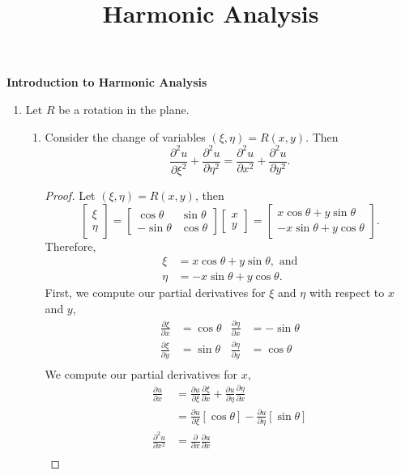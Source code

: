 \documentclass[12pt]{article}
\title{Harmonic Analysis}
\begin{document}
\noindent \textbf{Introduction to Harmonic Analysis}
\begin{enumerate}
\item Let $R$ be a rotation in the plane. 
\begin{enumerate}
\item Consider the change of variables $(\xi, \eta)=R(x,y)$. Then
$$\frac{\partial^2u}{\partial\xi^2} + \frac{\partial^2u}{\partial\eta^2} = \frac{\partial^2u}{\partial x^2} + \frac{\partial^2u}{\partial y^2}.$$
\begin{proof}
Let $(\xi, \eta) = R(x,y)$, then
$$\begin{bmatrix} \xi \\ \eta \end{bmatrix}= \begin{bmatrix}\cos \theta & \sin \theta \\ -\sin \theta & \cos \theta \end{bmatrix}\begin{bmatrix} x \\ y \end{bmatrix} = \begin{bmatrix} x\cos \theta + y \sin \theta \\ -x\sin \theta + y \cos \theta \end{bmatrix}.$$
Therefore, 
\begin{align*}
\xi &= x \cos\theta + y \sin\theta, \text{ and}\\
\eta &= -x\sin \theta + y\cos \theta.
\end{align*}
First, we compute our partial derivatives for $\xi$ and $\eta$ with respect to $x$ and $y$,
\begin{align*}
\frac{\partial \xi}{\partial x} &= \cos \theta & \frac{\partial \eta}{\partial x} &= -\sin \theta \\
\frac{\partial \xi}{\partial y} &= \sin \theta & \frac{\partial \eta}{\partial y} &= \cos \theta \\
\end{align*}
We compute our partial derivatives for $x$,
\begin{align*}
\frac{\partial u}{\partial x} &= \frac{\partial u}{\partial \xi}\frac{\partial \xi}{\partial x}+ \frac{\partial u}{\partial \eta}\frac{\partial \eta}{\partial x} \\
&= \frac{\partial u}{\partial \xi}[\cos\theta]- \frac{\partial u}{\partial \eta}[\sin \theta] \\
\frac{\partial^2 u}{\partial x^2} &= \frac{\partial}{\partial x}\frac{\partial u}{\partial x} \\

\end{align*}
\end{proof}
\end{enumerate}
\end{enumerate}
\end{document}
